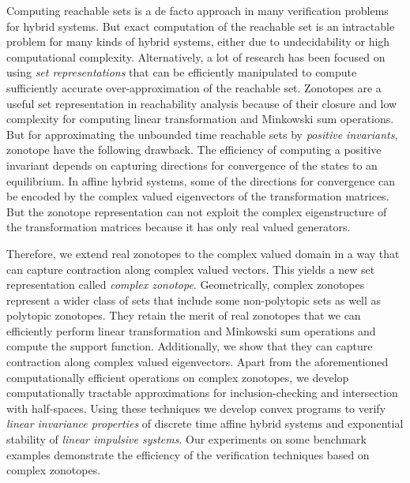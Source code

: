 Computing reachable sets is a de facto approach in many verification
problems for hybrid systems.  But exact computation of the reachable
set is an intractable problem for many kinds of hybrid systems, either
due to undecidability or high computational complexity.
Alternatively, a lot of research has been focused on using \emph{set
  representations} that can be efficiently manipulated to compute
sufficiently accurate over-approximation of the reachable set.
Zonotopes are a useful set representation in reachability analysis
because of their closure and low complexity for computing linear
transformation and Minkowski sum operations.  But for approximating the
unbounded time reachable sets by \emph{positive invariants}, zonotope
have the following drawback.  The efficiency of computing a positive
invariant depends on capturing directions for convergence of the states
to an equilibrium.  In affine hybrid systems, some of the directions
for convergence can be encoded by the complex valued eigenvectors of
the transformation matrices.  But the zonotope representation can not
exploit the complex eigenstructure of the transformation matrices
because it has only real valued generators.

Therefore, we extend real zonotopes to the complex valued domain in a
way that can capture contraction along complex valued vectors.  This
yields a new set representation called \emph{complex zonotope}.
Geometrically, complex zonotopes represent a wider class of sets that
include some non-polytopic sets as well as polytopic zonotopes.  They
retain the merit of real zonotopes that we can efficiently perform
linear transformation and Minkowski sum operations and compute the
support function.  Additionally, we show that they can capture
contraction along complex valued eigenvectors.  Apart from the
aforementioned computationally efficient operations on complex
zonotopes, we develop computationally tractable approximations for
inclusion-checking and intersection with half-spaces.  Using these
techniques we develop convex programs to verify \emph{linear
invariance properties} of discrete time affine hybrid systems and
exponential stability of \emph{linear impulsive systems}.  Our
experiments on some benchmark examples demonstrate the efficiency of
the verification techniques based on complex zonotopes.
